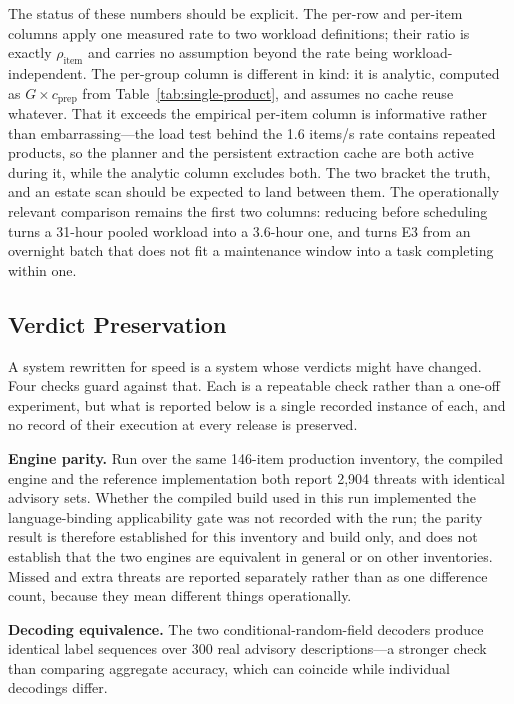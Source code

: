 \documentclass[fleqn,10pt,lineno]{wlpeerj}
\begin{document}


The status of these numbers should be explicit. The per-row and per-item columns apply one measured rate to two workload definitions; their ratio is exactly $\rho_{\text{item}}$ and carries no assumption beyond the rate being workload-independent. The per-group column is different in kind: it is analytic, computed as $G \times c_{\text{prep}}$ from Table~\ref{tab:single-product}, and assumes no cache reuse whatever. That it exceeds the empirical per-item column is informative rather than embarrassing---the load test behind the 1.6 items/s rate contains repeated products, so the planner and the persistent extraction cache are both active during it, while the analytic column excludes both. The two bracket the truth, and an estate scan should be expected to land between them. The operationally relevant comparison remains the first two columns: reducing before scheduling turns a 31-hour pooled workload into a 3.6-hour one, and turns E3 from an overnight batch that does not fit a maintenance window into a task completing within one.

\subsection{Verdict Preservation}
\label{sec:verdict-preservation}
A system rewritten for speed is a system whose verdicts might have changed. Four checks guard against that. Each is a repeatable check rather than a one-off experiment, but what is reported below is a single recorded instance of each, and no record of their execution at every release is preserved.

\textbf{Engine parity.} Run over the same 146-item production inventory, the compiled engine and the reference implementation both report 2,904 threats with identical advisory sets. Whether the compiled build used in this run implemented the language-binding applicability gate was not recorded with the run; the parity result is therefore established for this inventory and build only, and does not establish that the two engines are equivalent in general or on other inventories. Missed and extra threats are reported separately rather than as one difference count, because they mean different things operationally.

\textbf{Decoding equivalence.} The two conditional-random-field decoders produce identical label sequences over 300 real advisory descriptions---a stronger check than comparing aggregate accuracy, which can coincide while individual decodings differ.
\end{document}
